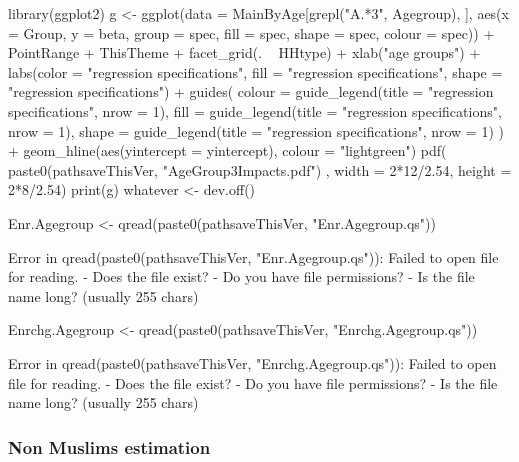 \begin{Schunk}
\begin{Sinput}
library(ggplot2)
g <- ggplot(data = MainByAge[grepl("A.*3", Agegroup), ], 
    aes(x = Group, y = beta, group = spec, fill = spec, shape = spec, colour = spec)) + 
  PointRange + ThisTheme + facet_grid(. ~ HHtype) +
  xlab("age groups") + 
  labs(color  = "regression specifications", fill = "regression specifications", 
    shape = "regression specifications") +
  guides(
    colour = guide_legend(title = "regression specifications", nrow = 1),
    fill = guide_legend(title = "regression specifications", nrow = 1),
    shape = guide_legend(title = "regression specifications", nrow = 1)
    ) +
  geom_hline(aes(yintercept = yintercept), colour = "lightgreen")
pdf(
  paste0(pathsaveThisVer, "AgeGroup3Impacts.pdf")
  , width = 2*12/2.54, height = 2*8/2.54)
print(g)
whatever <- dev.off()
\end{Sinput}
\end{Schunk}
\begin{Schunk}
\begin{Sinput}
Enr.Agegroup <- qread(paste0(pathsaveThisVer, "Enr.Agegroup.qs"))
\end{Sinput}
\begin{Soutput}
Error in qread(paste0(pathsaveThisVer, "Enr.Agegroup.qs")): Failed to open file for reading. 
- Does the file exist?
 - Do you have file permissions?
- Is the file name long? (usually 255 chars)
\end{Soutput}
\begin{Sinput}
Enrchg.Agegroup <- qread(paste0(pathsaveThisVer, "Enrchg.Agegroup.qs"))
\end{Sinput}
\begin{Soutput}
Error in qread(paste0(pathsaveThisVer, "Enrchg.Agegroup.qs")): Failed to open file for reading. 
- Does the file exist?
 - Do you have file permissions?
- Is the file name long? (usually 255 chars)
\end{Soutput}
\end{Schunk}


\subsubsection{Non Muslims estimation}

